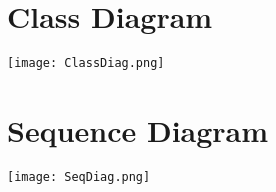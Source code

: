 \documentclass{article}
\begin{document}
\section*{Class Diagram}
\texttt{[image: ClassDiag.png]}
\section*{Sequence Diagram}
\texttt{[image: SeqDiag.png]}
\end{document}

